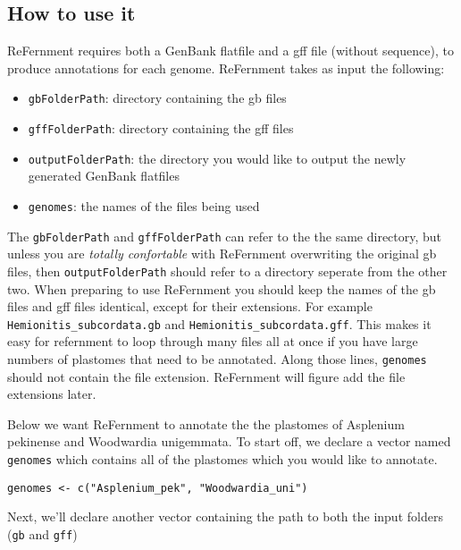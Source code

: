 \documentclass[]{article}
\providecommand{\tightlist}{%
  \setlength{\itemsep}{0pt}\setlength{\parskip}{0pt}}
\begin{document}
\hypertarget{how-to-use-it}{%
\subsection{How to use it}\label{how-to-use-it}}

ReFernment requires both a GenBank flatfile and a gff file (without
sequence), to produce annotations for each genome. ReFernment takes as
input the following:

\begin{itemize}
\tightlist
\item
  \texttt{gbFolderPath}: directory containing the gb files
\item
  \texttt{gffFolderPath}: directory containing the gff files
\item
  \texttt{outputFolderPath}: the directory you would like to output the
  newly generated GenBank flatfiles
\item
  \texttt{genomes}: the names of the files being used
\end{itemize}

The \texttt{gbFolderPath} and \texttt{gffFolderPath} can refer to the
the same directory, but unless you are \emph{totally confortable} with
ReFernment overwriting the original gb files, then
\texttt{outputFolderPath} should refer to a directory seperate from the
other two. When preparing to use ReFernment you should keep the names of
the gb files and gff files identical, except for their extensions. For
example \texttt{Hemionitis\_subcordata.gb} and
\texttt{Hemionitis\_subcordata.gff}. This makes it easy for refernment
to loop through many files all at once if you have large numbers of
plastomes that need to be annotated. Along those lines, \texttt{genomes}
should not contain the file extension. ReFernment will figure add the
file extensions later.

Below we want ReFernment to annotate the the plastomes of Asplenium
pekinense and Woodwardia unigemmata. To start off, we declare a vector
named \texttt{genomes} which contains all of the plastomes which you
would like to annotate.

\begin{verbatim}
genomes <- c("Asplenium_pek", "Woodwardia_uni")
\end{verbatim}

Next, we'll declare another vector containing the path to both the input
folders (\texttt{gb} and \texttt{gff})
\end{document}
